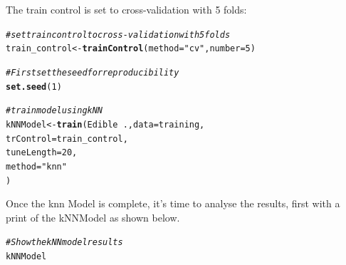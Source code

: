 \documentclass[10pt  ,usenames, dvipsnames]{article}\usepackage[]{graphicx}\usepackage[]{color}
\makeatletter
\newcommand{\hlnum}[1]{\textcolor[rgb]{0.686,0.059,0.569}{#1}}%
\newcommand{\hlstr}[1]{\textcolor[rgb]{0.192,0.494,0.8}{#1}}%
\newcommand{\hlcom}[1]{\textcolor[rgb]{0.678,0.584,0.686}{\textit{#1}}}%
\newcommand{\hlopt}[1]{\textcolor[rgb]{0,0,0}{#1}}%
\newcommand{\hlstd}[1]{\textcolor[rgb]{0.345,0.345,0.345}{#1}}%
\newcommand{\hlkwb}[1]{\textcolor[rgb]{0.69,0.353,0.396}{#1}}%
\newcommand{\hlkwc}[1]{\textcolor[rgb]{0.333,0.667,0.333}{#1}}%
\newcommand{\hlkwd}[1]{\textcolor[rgb]{0.737,0.353,0.396}{\textbf{#1}}}%
\newenvironment{kframe}{%
 \def\at@end@of@kframe{}%
 \ifinner\ifhmode%
  \def\at@end@of@kframe{\end{minipage}}%
  \begin{minipage}{\columnwidth}%
 \fi\fi%
 \def\FrameCommand##1{\hskip\@totalleftmargin \hskip-\fboxsep
 \colorbox{shadecolor}{##1}\hskip-\fboxsep
     \hskip-\linewidth \hskip-\@totalleftmargin \hskip\columnwidth}%
 \MakeFramed {\advance\hsize-\width
   \@totalleftmargin\z@ \linewidth\hsize
   \@setminipage}}%
 {\par\unskip\endMakeFramed%
 \at@end@of@kframe}
\newenvironment{knitrout}{}{} %
\makeatother
\begin{document}
The train control is set to cross-validation with 5 folds:
\begin{knitrout}
\color{fgcolor}\begin{kframe}
\begin{alltt}
\hlcom{#set train control to cross-validation with 5 folds}
\hlstd{train_control}\hlkwb{<-} \hlkwd{trainControl}\hlstd{(}\hlkwc{method}\hlstd{=}\hlstr{"cv"}\hlstd{,} \hlkwc{number}\hlstd{=}\hlnum{5}\hlstd{)}
\end{alltt}
\end{kframe}
\end{knitrout}



% 
\begin{knitrout}
\color{fgcolor}\begin{kframe}
\begin{alltt}
\hlcom{#First set the seed for reproducibility}
\hlkwd{set.seed}\hlstd{(}\hlnum{1}\hlstd{)}

\hlcom{#train model using kNN}
\hlstd{kNNModel} \hlkwb{<-} \hlkwd{train}\hlstd{(Edible} \hlopt{~} \hlstd{.,} \hlkwc{data} \hlstd{= training,}
                  \hlkwc{trControl} \hlstd{= train_control,}
                  \hlkwc{tuneLength} \hlstd{=} \hlnum{20}\hlstd{,}
                  \hlkwc{method} \hlstd{=} \hlstr{"knn"}
\hlstd{)}
\end{alltt}
\end{kframe}
\end{knitrout}




Once the knn Model is complete, it's time to analyse the results, first with a print of the kNNModel as shown below.

\begin{knitrout}
\color{fgcolor}\begin{kframe}
\begin{alltt}
\hlcom{#Show the kNN model results}
\hlstd{kNNModel}
\end{alltt}
\end{kframe}
\end{knitrout}
\end{document}
